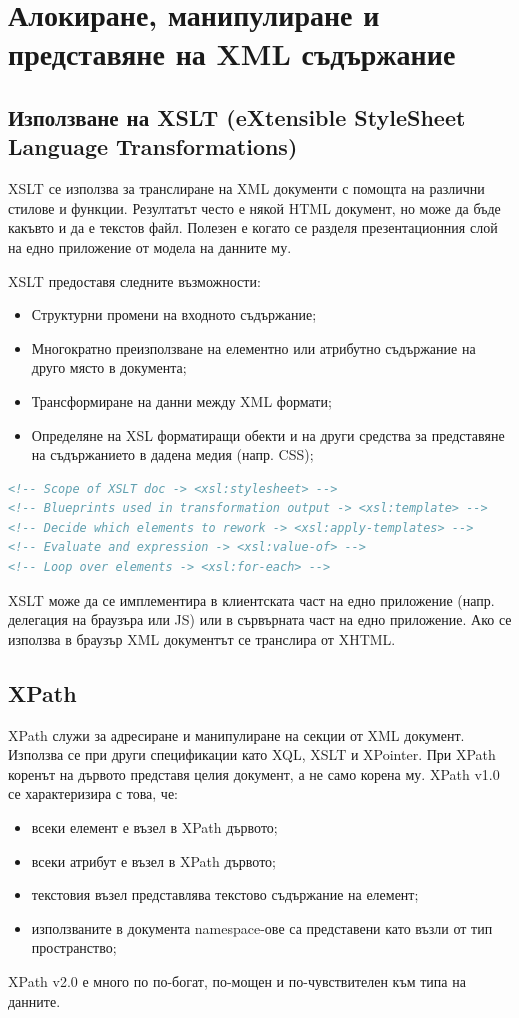 \documentclass[fleqn,12pt]{article}
\begin{document}
\section{Алокиране, манипулиране и представяне на XML съдържание}

\subsection{Използване на XSLT (eXtensible StyleSheet Language Transformations)}

XSLT се използва за транслиране на XML документи с помощта на различни стилове и функции.
Резултатът често е някой HTML документ, но може да бъде какъвто и да е текстов файл.
Полезен е когато се разделя презентационния слой на едно приложение от модела на данните му.

XSLT предоставя следните възможности:
\begin{itemize}
    \item Структурни промени на входното съдържание;
    \item Многократно преизползване на елементно или атрибутно съдържание на друго място в документа;
    \item Трансформиране на данни между XML формати;
    \item Определяне на XSL форматиращи обекти и на други средства за представяне на съдържанието в дадена медия (напр. CSS);
\end{itemize}

\begin{lstlisting}[language=XML, caption=XSLT elements]
<!-- Scope of XSLT doc -> <xsl:stylesheet> -->
<!-- Blueprints used in transformation output -> <xsl:template> -->
<!-- Decide which elements to rework -> <xsl:apply-templates> -->
<!-- Evaluate and expression -> <xsl:value-of> -->
<!-- Loop over elements -> <xsl:for-each> -->
\end{lstlisting}

XSLT може да се имплементира в клиентската част на едно приложение (напр. делегация на браузъра или JS) или в сървърната част на едно приложение.
Ако се използва в браузър XML документът се транслира от XHTML.

\subsection{XPath}

XPath служи за адресиране и манипулиране на секции от XML документ.
Използва се при други спецификации като XQL, XSLT и XPointer.
\bigbreak
При XPath коренът на дървото представя целия документ, а не само корена му.
XPath v1.0 се характеризира с това, че:
\begin{itemize}
    \item всеки елемент е възел в XPath дървото;
    \item всеки атрибут е възел в XPath дървото;
    \item текстовия възел представлява текстово съдържание на елемент;
    \item използваните в документа namespace-ове са представени като възли от тип пространство;
\end{itemize}
XPath v2.0 е много по по-богат, по-мощен и по-чувствителен към типа на данните.
\end{document}
